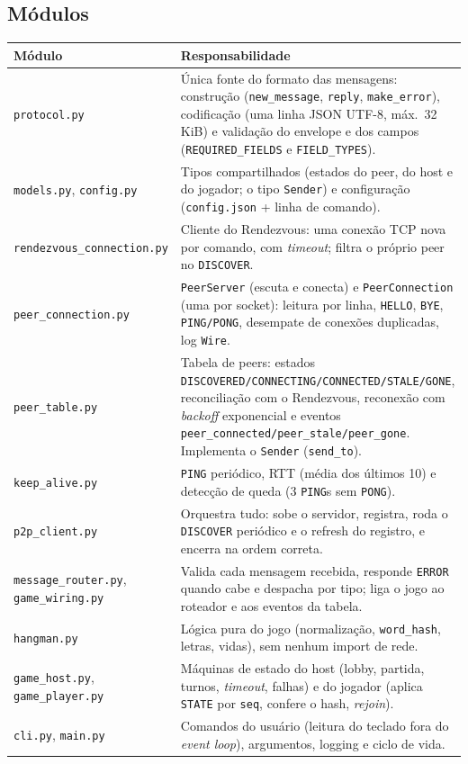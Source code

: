 \documentclass[11pt,a4paper]{article}
\begin{document}
\subsection{Módulos}
\begin{tabularx}{\textwidth}{@{}P{5cm}Y@{}}
\toprule
\textbf{Módulo} & \textbf{Responsabilidade}\\
\midrule
\texttt{protocol.py} & Única fonte do formato das mensagens: construção (\texttt{new\_message}, \texttt{reply}, \texttt{make\_error}), codificação (uma linha JSON UTF-8, máx.\ 32 KiB) e validação do envelope e dos campos (\texttt{REQUIRED\_FIELDS} e \texttt{FIELD\_TYPES}).\\
\texttt{models.py}, \texttt{config.py} & Tipos compartilhados (estados do peer, do host e do jogador; o tipo \texttt{Sender}) e configuração (\texttt{config.json} + linha de comando).\\
\texttt{rendezvous\_connection.py} & Cliente do Rendezvous: uma conexão TCP nova por comando, com \emph{timeout}; filtra o próprio peer no \texttt{DISCOVER}.\\
\texttt{peer\_connection.py} & \texttt{PeerServer} (escuta e conecta) e \texttt{PeerConnection} (uma por socket): leitura por linha, \texttt{HELLO}, \texttt{BYE}, \texttt{PING/PONG}, desempate de conexões duplicadas, log \texttt{Wire}.\\
\texttt{peer\_table.py} & Tabela de peers: estados \texttt{DISCOVERED/CONNECTING/CONNECTED/STALE/GONE}, reconciliação com o Rendezvous, reconexão com \emph{backoff} exponencial e eventos \texttt{peer\_connected/peer\_stale/peer\_gone}. Implementa o \texttt{Sender} (\texttt{send\_to}).\\
\texttt{keep\_alive.py} & \texttt{PING} periódico, RTT (média dos últimos 10) e detecção de queda (3 \texttt{PING}s sem \texttt{PONG}).\\
\texttt{p2p\_client.py} & Orquestra tudo: sobe o servidor, registra, roda o \texttt{DISCOVER} periódico e o refresh do registro, e encerra na ordem correta.\\
\texttt{message\_router.py}, \texttt{game\_wiring.py} & Valida cada mensagem recebida, responde \texttt{ERROR} quando cabe e despacha por tipo; liga o jogo ao roteador e aos eventos da tabela.\\
\texttt{hangman.py} & Lógica pura do jogo (normalização, \texttt{word\_hash}, letras, vidas), sem nenhum import de rede.\\
\texttt{game\_host.py}, \texttt{game\_player.py} & Máquinas de estado do host (lobby, partida, turnos, \emph{timeout}, falhas) e do jogador (aplica \texttt{STATE} por \texttt{seq}, confere o hash, \emph{rejoin}).\\
\texttt{cli.py}, \texttt{main.py} & Comandos do usuário (leitura do teclado fora do \emph{event loop}), argumentos, logging e ciclo de vida.\\
\bottomrule
\end{tabularx}
\end{document}
